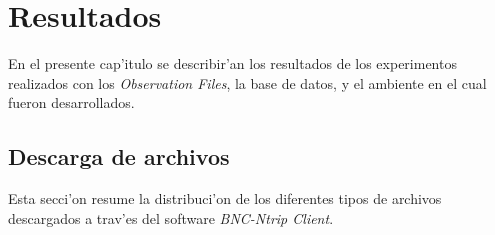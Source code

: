 \titlespacing{\chapter}{0 pt}{30 pt}{50 pt}[0 pt]
\titleformat{\section}{\Large\bfseries}{\thesection}{0 pt}{\hspace{30 pt}}
\titleformat{\subsection}{\large\bfseries}{\thesubsection}{0 pt}{\hspace{30 pt}}
\pagestyle{fancy}
\fancyhead[LO,LE]{\footnotesize\emph{\leftmark}}
\fancyhead[RO,RE]{\thepage}
\fancyfoot[CO,CE]{}

\chapter{Resultados} %

\normalsize
\noindent
En el presente cap'itulo se describir'an los resultados de los experimentos realizados con los \emph{Observation Files}, la base de datos, y el ambiente en el cual fueron desarrollados.\\

\section{Descarga de archivos}
\noindent
Esta secci'on resume la distribuci'on de los diferentes tipos de archivos descargados a trav'es del software \emph{BNC-Ntrip Client}.

\begin{table}[H]
\begin{center}
\end{center}
\caption{Distribuci'on de los archivos descargados }
\end{table}

